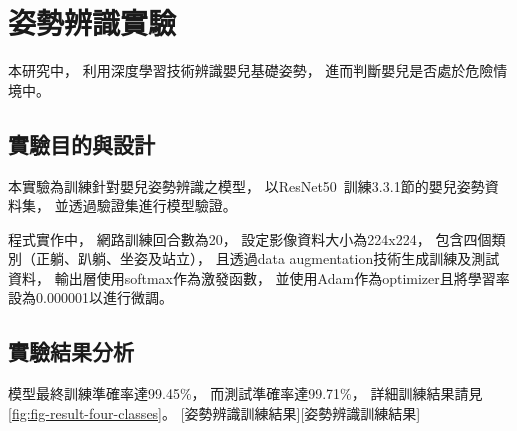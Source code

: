 \documentclass[class=NCU_thesis, crop=false]{standalone}
\begin{document}
\section{姿勢辨識實驗}
本研究中，
利用深度學習技術辨識嬰兒基礎姿勢，
進而判斷嬰兒是否處於危險情境中。

\subsection{實驗目的與設計}
本實驗為訓練針對嬰兒姿勢辨識之模型，
以ResNet50~\cite{he_deep_2016}訓練3.3.1節的嬰兒姿勢資料集，
並透過驗證集進行模型驗證。

程式實作中，
網路訓練回合數為20，
設定影像資料大小為224x224，
包含四個類別（正躺、趴躺、坐姿及站立），
且透過data augmentation技術生成訓練及測試資料，
輸出層使用softmax作為激發函數，
並使用Adam作為optimizer且將學習率設為0.000001以進行微調。

\subsection{實驗結果分析}
模型最終訓練準確率達99.45\%，
而測試準確率達99.71\%，
詳細訓練結果請見\cref{fig:fig-result-four-classes}。
[姿勢辨識訓練結果][姿勢辨識訓練結果]
\end{document}
